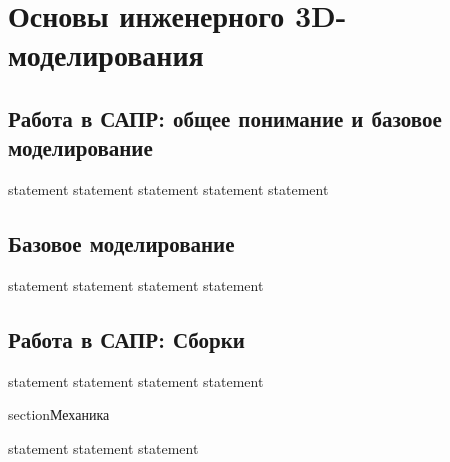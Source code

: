 \chapter{Основы инженерного 3D-моделирования}

\section{Работа в САПР: общее понимание и базовое моделирование}

{statement}
{statement}
{statement}
{statement}
{statement}

\section{Базовое моделирование}

{statement}
{statement}
{statement}
{statement}

\section{Работа в САПР: Сборки}

{statement}
{statement}
{statement}
{statement}

section{Механика}

{statement}
{statement}
{statement}
